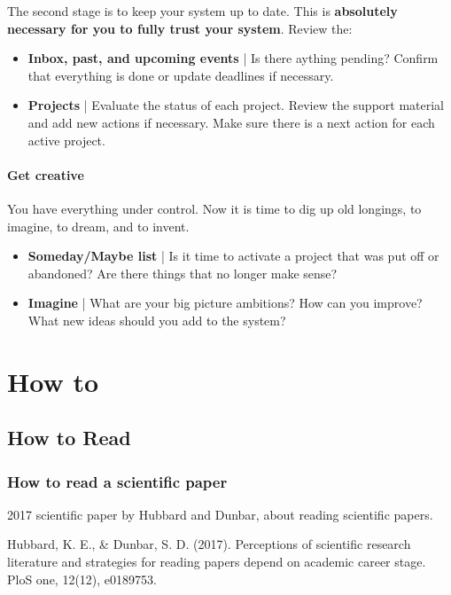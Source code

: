 The second stage is to keep your system up to date. This is \textbf{absolutely necessary for you to fully trust your system}. Review the:
\begin{itemize}
\item
	\textbf{Inbox, past, and upcoming events} | Is there aything pending? Confirm that everything is done or update deadlines if necessary.
\item
	\textbf{Projects} | Evaluate the status of each project. Review the support material and add new actions if necessary. Make sure there is a next action for each active project.
\end{itemize}

\subsubsection*{Get creative}
You have everything under control. Now it is time to dig up old longings, to imagine, to dream, and to invent.
\begin{itemize}
\item \textbf{Someday/Maybe list} | Is it time to activate a project that was put off or abandoned? Are there things that no longer make sense?

\item \textbf{Imagine} | What are your big picture ambitions? How can you improve? What new ideas should you add to the system?

\end{itemize}

\chapter{How to}

\section{How to Read}

\subsection{How to read a scientific paper}
 2017 scientific paper by Hubbard and Dunbar, about reading scientific papers.

 Hubbard, K. E., \& Dunbar, S. D. (2017). Perceptions of scientific research literature and strategies for reading papers depend on academic career stage. PloS one, 12(12), e0189753.

